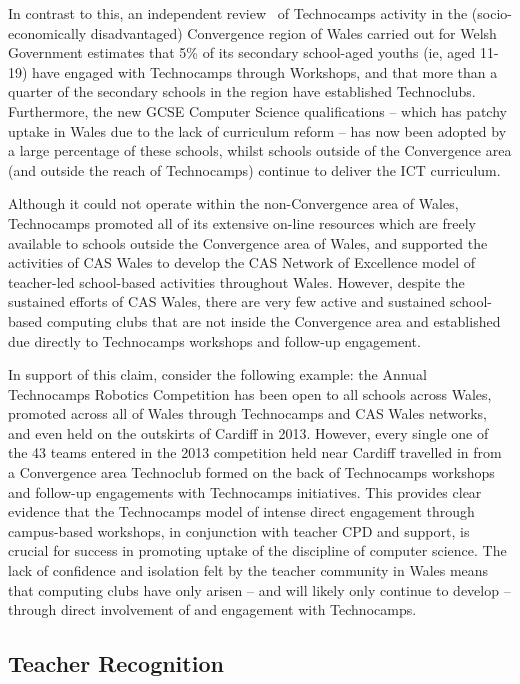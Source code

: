 In contrast to this, an independent review~\cite{Wavehill:2015} of
Technocamps activity in the (socio-economically disadvantaged)
Convergence region of Wales carried out for Welsh Government estimates
that 5\% of its secondary school-aged youths (ie, aged 11-19) have
engaged with Technocamps through Workshops, and that more than a
quarter of the secondary schools in the region have established
Technoclubs.  Furthermore, the new GCSE Computer Science
qualifications -- which has patchy uptake in Wales due to the lack of
curriculum reform -- has now been adopted by a large percentage of
these schools, whilst schools outside of the Convergence area (and
outside the reach of Technocamps) continue to deliver the ICT
curriculum.

Although it could not operate within the non-Convergence area of
Wales, Technocamps promoted all of its extensive on-line resources
which are freely available to schools outside the Convergence area of
Wales, and supported the activities of CAS Wales to develop the CAS
Network of Excellence model of teacher-led school-based activities
throughout Wales. However, despite the sustained efforts of CAS
Wales, there are very few active and sustained school-based computing
clubs that are not inside the Convergence area and established due
directly to Technocamps workshops and follow-up engagement.

In support of this claim, consider the following example: the Annual
Technocamps Robotics Competition has been open to all schools across
Wales, promoted across all of Wales through Technocamps and CAS Wales
networks, and even held on the outskirts of Cardiff in 2013.  However,
every single one of the 43 teams entered in the 2013 competition held
near Cardiff travelled in from a Convergence area Technoclub formed on
the back of Technocamps workshops and follow-up engagements with
Technocamps initiatives. This provides clear evidence that the
Technocamps model of intense direct engagement through campus-based
workshops, in conjunction with teacher CPD and support, is crucial for
success in promoting uptake of the discipline of computer science. The
lack of confidence and isolation felt by the teacher community in
Wales means that computing clubs have only arisen -- and will likely
only continue to develop -- through direct involvement of and
engagement with Technocamps.

\subsection{Teacher Recognition}\label{teacherrecog}

